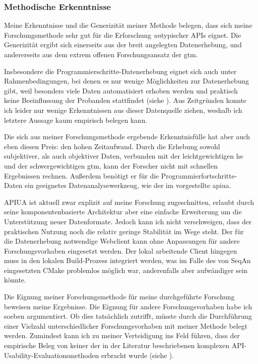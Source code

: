 \subsubsection{Methodische Erkenntnisse}

Meine Erkenntnisse und die Generizität meiner Methode belegen, dass sich meine Forschungsmethode sehr gut für die Erforschung \textit{un}typischer APIs eignet. Die Generizität ergibt sich einerseits aus der breit angelegten Datenerhebung, und andererseits aus dem extrem offenen Forschungsansatz der \gls{gtm}.

Insbesondere die Programmierschritte-Datenerhebung eignet sich auch unter Rahmenbedingungen, bei denen es nur wenige Möglichkeiten zur Datenerhebung gibt, weil besonders viele Daten automatisiert erhoben werden und praktisch keine Beeinflussung der Probanden stattfindet (siehe ). Aus Zeitgründen konnte ich leider nur wenige Erkenntnissen aus dieser Datenquelle ziehen, weshalb ich letztere Aussage kaum empirisch belegen kann.

Die sich aus meiner Forschungsmethode ergebende Erkenntnisfülle hat aber auch eben diesen Preis: den hohen Zeitaufwand. Durch die Erhebung sowohl subjektiver, als auch objektiver Daten, verbunden mit der leichtgewichtigen \acrshort{he} und der schwergewichtigen \gls{gtm}, kann der Forscher nicht mit schnellen Ergebnissen rechnen. Außerdem benötigt er für die Programmierfortschritte-Daten ein geeignetes Datenanalysewerkzeug, wie der im  vorgestellte \gls{apiua}.

APIUA ist aktuell zwar explizit auf meine Forschung zugeschnitten, erlaubt durch seine komponentenbasierte Architektur aber eine einfache Erweiterung um die Unterstützung neuer Datenformate. Jedoch kann ich nicht verschweigen, dass der praktischen Nutzung noch die relativ geringe Stabilität im Wege steht. Der für die Datenerhebung notwendige Webclient kann ohne Anpassungen für andere Forschungsvorhaben eingesetzt werden. Der lokal arbeitende Client hingegen muss in den lokalen Build-Prozess integriert werden, was im Falle des von SeqAn eingesetzten CMake problemlos möglich war, anderenfalls aber aufwändiger sein könnte.

Die Eignung meiner Forschungsmethode für meine durchgeführte Forschung beweisen meine Ergebnisse. Die Eignung für andere Forschungsvorhaben habe ich soeben argumentiert. Ob dies tatsächlich zutrifft, müsste durch die Durchführung einer Vielzahl unterschiedlicher Forschungsvorhaben mit meiner Methode belegt werden. Zumindest kann ich zu meiner Verteidigung ins Feld führen, dass der empirische Beleg von keiner der in der Literatur beschriebenen komplexen API-Usability-Evaluationsmethoden erbracht wurde (siehe ).

